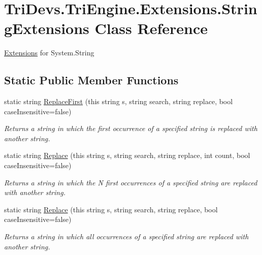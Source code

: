 \hypertarget{class_tri_devs_1_1_tri_engine_1_1_extensions_1_1_string_extensions}{\section{Tri\-Devs.\-Tri\-Engine.\-Extensions.\-String\-Extensions Class Reference}
\label{class_tri_devs_1_1_tri_engine_1_1_extensions_1_1_string_extensions}
}


\hyperlink{namespace_tri_devs_1_1_tri_engine_1_1_extensions}{Extensions} for System.\-String  


\subsection*{Static Public Member Functions}
\begin{DoxyCompactItemize}
\item 
static string \hyperlink{class_tri_devs_1_1_tri_engine_1_1_extensions_1_1_string_extensions_aaf8e22b3fc467ca0a60930c95b0da275}{Replace\-First} (this string s, string search, string replace, bool case\-Insensitive=false)
\begin{DoxyCompactList}\small\item\em Returns a string in which the first occurrence of a specified string is replaced with another string. \end{DoxyCompactList}\item 
static string \hyperlink{class_tri_devs_1_1_tri_engine_1_1_extensions_1_1_string_extensions_a5577f5dbd781157c2af561a594d7e4b4}{Replace} (this string s, string search, string replace, int count, bool case\-Insensitive=false)
\begin{DoxyCompactList}\small\item\em Returns a string in which the N first occurrences of a specified string are replaced with another string. \end{DoxyCompactList}\item 
static string \hyperlink{class_tri_devs_1_1_tri_engine_1_1_extensions_1_1_string_extensions_a6b790ff74822667e6f43d7b477565cd9}{Replace} (this string s, string search, string replace, bool case\-Insensitive=false)
\begin{DoxyCompactList}\small\item\em Returns a string in which all occurrences of a specified string are replaced with another string. \end{DoxyCompactList}\end{DoxyCompactItemize}


